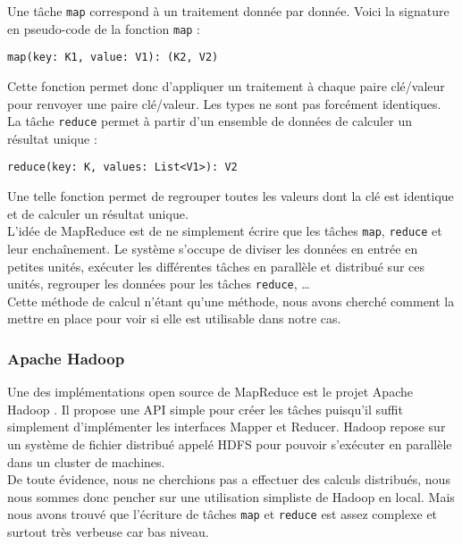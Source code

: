 Une tâche \verb+map+ correspond à un traitement donnée par donnée. Voici la signature en pseudo-code de la fonction \verb+map+ :

\begin{center}
 \verb+map(key: K1, value: V1): (K2, V2)+
\end{center}

Cette fonction permet donc d'appliquer un traitement à chaque paire clé/valeur pour renvoyer une paire clé/valeur. Les types ne sont pas forcément identiques. La tâche \verb+reduce+ permet à partir d'un ensemble de données de calculer un résultat unique :

\begin{center}
 \verb+reduce(key: K, values: List<V1>): V2+
\end{center}

Une telle fonction permet de regrouper toutes les valeurs dont la clé est identique et de calculer un résultat unique.\\

L'idée de MapReduce est de ne simplement écrire que les tâches \verb+map+, \verb+reduce+ et leur enchaînement. Le système s'occupe de diviser les données en entrée en petites unités, exécuter les différentes tâches en parallèle et distribué sur ces unités, regrouper les données pour les tâches \verb+reduce+, \dots{}\\

Cette méthode de calcul n'étant qu'une méthode, nous avons cherché comment la mettre en place pour voir si elle est utilisable dans notre cas.

\subsubsection{Apache Hadoop}

Une des implémentations open source de MapReduce est le projet Apache Hadoop \cite{hadoop}. Il propose une API simple pour créer les tâches puisqu'il suffit simplement d'implémenter les interfaces Mapper et Reducer. Hadoop repose sur un système de fichier distribué appelé HDFS pour pouvoir s'exécuter en parallèle dans un cluster de machines.\\

De toute évidence, nous ne cherchions pas a effectuer des calculs distribués, nous nous sommes donc pencher sur une utilisation simpliste de Hadoop en local. Mais nous avons trouvé que l'écriture de tâches \verb+map+ et \verb+reduce+ est assez complexe et surtout très verbeuse car bas niveau.\\

